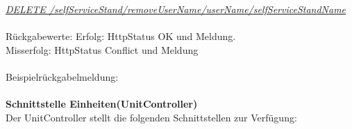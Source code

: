 \textit{\underline{DELETE /selfServiceStand/{removeUserName}/{userName}/{selfServiceStandName}}}
\\
\\
Rückgabewerte: \tab 					Erfolg: HttpStatus OK und Meldung.\\
\tab \tab 								Misserfolg: HttpStatus Conflict und Meldung\\
\\
Beispielrückgabelmeldung:	
\\
\\
\textbf{Schnittstelle Einheiten(UnitController)}
\\
Der UnitController stellt die folgenden Schnittstellen zur Verfügung:

